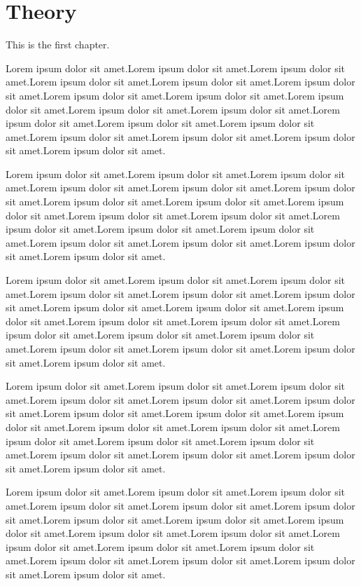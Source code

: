 \documentclass[main.tex]{subfiles}
\begin{document}
\chapter{Theory}
This is the first chapter.

Lorem ipsum dolor sit amet.Lorem ipsum dolor sit amet.Lorem ipsum dolor sit amet.Lorem ipsum dolor sit amet.Lorem ipsum dolor sit amet.Lorem ipsum dolor sit amet.Lorem ipsum dolor sit amet.Lorem ipsum dolor sit amet.Lorem ipsum dolor sit amet.Lorem ipsum dolor sit amet.Lorem ipsum dolor sit amet.Lorem ipsum dolor sit amet.Lorem ipsum dolor sit amet.Lorem ipsum dolor sit amet.Lorem ipsum dolor sit amet.Lorem ipsum dolor sit amet.Lorem ipsum dolor sit amet.Lorem ipsum dolor sit amet.

Lorem ipsum dolor sit amet.Lorem ipsum dolor sit amet.Lorem ipsum dolor sit amet.Lorem ipsum dolor sit amet.Lorem ipsum dolor sit amet.Lorem ipsum dolor sit amet.Lorem ipsum dolor sit amet.Lorem ipsum dolor sit amet.Lorem ipsum dolor sit amet.Lorem ipsum dolor sit amet.Lorem ipsum dolor sit amet.Lorem ipsum dolor sit amet.Lorem ipsum dolor sit amet.Lorem ipsum dolor sit amet.Lorem ipsum dolor sit amet.Lorem ipsum dolor sit amet.Lorem ipsum dolor sit amet.Lorem ipsum dolor sit amet.

Lorem ipsum dolor sit amet.Lorem ipsum dolor sit amet.Lorem ipsum dolor sit amet.Lorem ipsum dolor sit amet.Lorem ipsum dolor sit amet.Lorem ipsum dolor sit amet.Lorem ipsum dolor sit amet.Lorem ipsum dolor sit amet.Lorem ipsum dolor sit amet.Lorem ipsum dolor sit amet.Lorem ipsum dolor sit amet.Lorem ipsum dolor sit amet.Lorem ipsum dolor sit amet.Lorem ipsum dolor sit amet.Lorem ipsum dolor sit amet.Lorem ipsum dolor sit amet.Lorem ipsum dolor sit amet.Lorem ipsum dolor sit amet.

Lorem ipsum dolor sit amet.Lorem ipsum dolor sit amet.Lorem ipsum dolor sit amet.Lorem ipsum dolor sit amet.Lorem ipsum dolor sit amet.Lorem ipsum dolor sit amet.Lorem ipsum dolor sit amet.Lorem ipsum dolor sit amet.Lorem ipsum dolor sit amet.Lorem ipsum dolor sit amet.Lorem ipsum dolor sit amet.Lorem ipsum dolor sit amet.Lorem ipsum dolor sit amet.Lorem ipsum dolor sit amet.Lorem ipsum dolor sit amet.Lorem ipsum dolor sit amet.Lorem ipsum dolor sit amet.Lorem ipsum dolor sit amet.

Lorem ipsum dolor sit amet.Lorem ipsum dolor sit amet.Lorem ipsum dolor sit amet.Lorem ipsum dolor sit amet.Lorem ipsum dolor sit amet.Lorem ipsum dolor sit amet.Lorem ipsum dolor sit amet.Lorem ipsum dolor sit amet.Lorem ipsum dolor sit amet.Lorem ipsum dolor sit amet.Lorem ipsum dolor sit amet.Lorem ipsum dolor sit amet.Lorem ipsum dolor sit amet.Lorem ipsum dolor sit amet.Lorem ipsum dolor sit amet.Lorem ipsum dolor sit amet.Lorem ipsum dolor sit amet.Lorem ipsum dolor sit amet.
\end{document}
